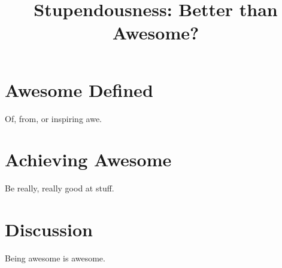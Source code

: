 \documentclass{article}
\begin{document}
\title{Stupendousness: Better than Awesome?}

\section{Awesome Defined}

Of, from, or inspiring awe.

\section{Achieving Awesome}

Be really, really good at stuff.

\section{Discussion}

Being awesome is awesome.
\end{document}
